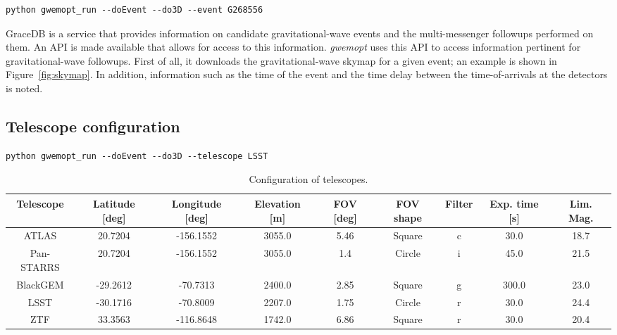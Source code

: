 \documentclass[twocolumn]{aastex62}
\begin{document}
\begin{lstlisting}
python gwemopt_run --doEvent --do3D --event G268556
\end{lstlisting}

GraceDB is a service that provides information on candidate gravitational-wave events and the multi-messenger followups performed on them. An API is made available that allows for access to this information.
\emph{gwemopt} uses this API to access information pertinent for gravitational-wave followups.
First of all, it downloads the gravitational-wave skymap for a given event; an example is shown in Figure~\ref{fig:skymap}.
In addition, information such as the time of the event and the time delay between the time-of-arrivals at the detectors is noted.

\subsection{Telescope configuration}
\label{subsection:config}
\begin{lstlisting}
python gwemopt_run --doEvent --do3D --telescope LSST
\end{lstlisting}
\begin{table}[t]
\scriptsize
\centering
\begin{tabular}{|c|c|c|c|c|c|c|c|c|}
\hline
Telescope & Latitude {[}deg{]} & Longitude {[}deg{]} & Elevation {[}m{]} & FOV {[}deg{]} & FOV shape & Filter & Exp. time {[}s{]} & Lim. Mag. \\ \hline
ATLAS          & 20.7204            & -156.1552           & 3055.0            & 5.46                                      & Square              & c      & 30.0                  & 18.7               \\ \hline
Pan-STARRS     & 20.7204            & -156.1552           & 3055.0            & 1.4                                      & Circle              & i      & 45.0                  & 21.5               \\ \hline
BlackGEM       & -29.2612           & -70.7313            & 2400.0            & 2.85 & Square              & g      & 300.0                 & 23.0               \\ \hline
LSST           & -30.1716           & -70.8009            & 2207.0            & 1.75                                      & Circle              & r      & 30.0                  & 24.4               \\ \hline
ZTF            & 33.3563            & -116.8648           & 1742.0            & 6.86  & Square              & r      & 30.0                  & 20.4               \\ \hline
\end{tabular}
\caption{Configuration of telescopes.}
\label{table:config}
\end{table}
\end{document}
